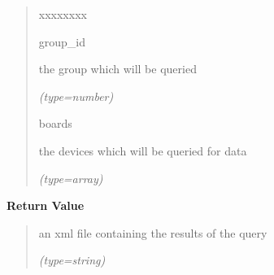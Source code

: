 \begin{boxedminipage}{\funcwidth}
\begin{quote}
\begin{Ventry}{xxxxxxxx}
          \item[group\_id]

          the group which will be queried

            {\it (type=number)}

          \item[boards]

          the devices which will be queried for data

            {\it (type=array)}

        \end{Ventry}

      \end{quote}

      \textbf{Return Value}
    \vspace{-1ex}

      \begin{quote}
      an xml file containing the results of the query

      {\it (type=string)}

      \end{quote}

    \end{boxedminipage}

    \label{DBE:DBE:get_times}

    \vspace{0.5ex}


